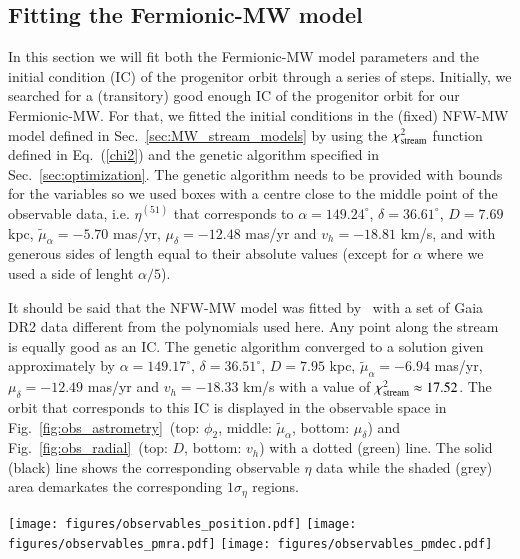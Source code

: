 \documentclass[twocolumn]{aa}
\begin{document}
\subsection{Fitting the Fermionic-MW model}
In this section we will fit both the Fermionic-MW model parameters and the initial condition (IC) of the progenitor orbit through a series of steps.
Initially, we searched for a (transitory) good enough IC of the progenitor orbit for our
Fermionic-MW. For that, we fitted the initial conditions in the (fixed) NFW-MW model defined in
Sec.~\ref{sec:MW_stream_models} by using the $\chi^2_{\rm{stream}}$ function defined in Eq.~(\ref{chi2})
and the genetic algorithm specified in Sec.~\ref{sec:optimization}. The genetic algorithm
needs to be provided with bounds for the variables so we used boxes with a centre close to the middle point
of the observable data, i.e. $\eta^{(51)}$ that corresponds to $\alpha=149.24^{\circ}$, $\delta=36.61^{\circ}$, $D=7.69$ kpc, $\tilde{\mu}_\alpha=-5.70$ mas/yr, $\mu_\delta=-12.48$ mas/yr and $v_h=-18.81$ km/s, and with generous sides of length equal to their absolute values (except for $\alpha$ where we used a side of lenght $\alpha/5$).

It should be said that the NFW-MW model was fitted by~\citet{2019MNRAS.486.2995M} with a set of Gaia
DR2 data different from the polynomials used here. Any point along the stream is equally good as an IC. The genetic algorithm converged to a solution given approximately by
$\alpha=149.17^{\circ}$, $\delta=36.51^{\circ}$, $D=7.95$ kpc, $\tilde{\mu}_\alpha=-6.94$ mas/yr, $\mu_\delta=-12.49$ mas/yr and $v_h=-18.33$ km/s with a value of $\chi^2_{\rm{stream}}\approx 17.52$.
The orbit that corresponds to this IC is displayed in the observable space in Fig.~\ref{fig:obs_astrometry}~(top: $\phi_2$, middle: $\tilde{\mu}_\alpha$, bottom: $\mu_\delta$) and Fig.~\ref{fig:obs_radial}~(top: $D$, bottom: $v_h$) with a dotted (green) line. The solid (black) line shows the corresponding observable $\eta$ data while the shaded (grey) area demarkates the corresponding $1\sigma_\eta$ regions.
\begin{figure*}
   \centering
   \texttt{[image: figures/observables\_position.pdf]}
   \texttt{[image: figures/observables\_pmra.pdf]}
   \texttt{[image: figures/observables\_pmdec.pdf]}
   \caption{Stream fits in astrometric observable space: sky position (top: $\phi_2$) and proper motions (middle: $\tilde{\mu}_\alpha$, bottom: $\mu_\delta$).}
   \label{fig:obs_astrometry}
\end{figure*}
\end{document}
